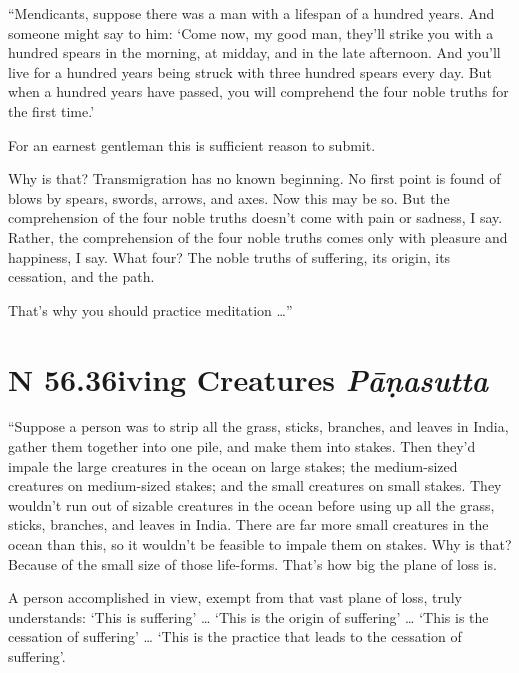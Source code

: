 \documentclass[12pt,openany]{book}%
\newcommand*{\suttatitleacronym}[1]{\smaller[2]{#1}\vspace*{.3em}}
\newcommand*{\suttatitletranslation}[1]{\linebreak{#1}}
\newcommand*{\suttatitleroot}[1]{\linebreak\smaller[2]\itshape{#1}}
\newcommand*{\tocacronym}[1]{\hspace*{-3.3em}{#1}\quad}
\newcommand*{\toctranslation}[1]{#1}
\newcommand*{\tocroot}[1]{(\textit{#1})}
\begin{document}
“Mendicants, suppose there was a man with a lifespan of a hundred years. And someone might say to him: ‘Come now, my good man, they’ll strike you with a hundred spears in the morning, at midday, and in the late afternoon. And you’ll live for a hundred years being struck with three hundred spears every day. But when a hundred years have passed, you will comprehend the four noble truths for the first time.’ 

For an earnest gentleman this is sufficient reason to submit. 

Why is that? Transmigration has no known beginning. No first point is found of blows by spears, swords, arrows, and axes. Now this may be so. But the comprehension of the four noble truths doesn’t come with pain or sadness, I say. Rather, the comprehension of the four noble truths comes only with pleasure and happiness, I say. What four? The noble truths of suffering, its origin, its cessation, and the path. 

That’s why you should practice meditation …” 

%
\section*{{\suttatitleacronym SN 56.36}{\suttatitletranslation Living Creatures }{\suttatitleroot Pāṇasutta}}
\addcontentsline{toc}{section}{\tocacronym{SN 56.36} \toctranslation{Living Creatures } \tocroot{Pāṇasutta}}

“Suppose a person was to strip all the grass, sticks, branches, and leaves in India, gather them together into one pile, and make them into stakes. Then they’d impale the large creatures in the ocean on large stakes; the medium-sized creatures on medium-sized stakes; and the small creatures on small stakes. They wouldn’t run out of sizable creatures in the ocean before using up all the grass, sticks, branches, and leaves in India. There are far more small creatures in the ocean than this, so it wouldn’t be feasible to impale them on stakes. Why is that? Because of the small size of those life-forms. That’s how big the plane of loss is. 

A person accomplished in view, exempt from that vast plane of loss, truly understands: ‘This is suffering’ … ‘This is the origin of suffering’ … ‘This is the cessation of suffering’ … ‘This is the practice that leads to the cessation of suffering’. 
\end{document}
